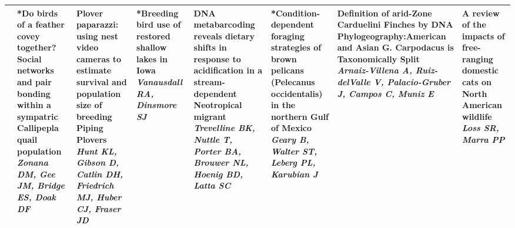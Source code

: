 \begin{tabular}{|x{0.85cm}|x{2.85cm}|x{2.85cm}|x{2.85cm}|x{2.85cm}|x{2.85cm}|x{2.85cm}|a{2.85cm}|}
&*Do birds of a feather covey together? Social networks and pair bonding within a sympatric Callipepla quail population \newline \newline \textit{Zonana DM, Gee JM, Bridge ES, Doak DF} & Plover paparazzi: using nest video cameras to estimate survival and population size of breeding Piping Plovers \newline \newline \textit{Hunt KL, Gibson D, Catlin DH, Friedrich MJ, Huber CJ, Fraser JD} & *Breeding bird use of restored shallow lakes in Iowa \newline \newline \textit{Vanausdall RA, Dinsmore SJ} & DNA metabarcoding reveals dietary shifts in response to acidification in a stream-dependent Neotropical migrant \newline \newline \textit{Trevelline BK, Nuttle T, Porter BA, Brouwer NL, Hoenig BD, Latta SC} & *Condition-dependent foraging strategies of brown pelicans (Pelecanus occidentalis) in the northern Gulf of Mexico \newline \newline \textit{Geary B, Walter ST, Leberg PL, Karubian J} & Definition of arid-Zone Carduelini Finches by DNA Phylogeography:American and Asian G. Carpodacus is Taxonomically Split \newline \newline \textit{Arnaiz-Villena A, Ruiz-delValle V, Palacio-Gruber J, Campos C, Muniz E} & A review of the impacts of free-ranging domestic cats on North American wildlife \newline \newline \textit{Loss SR, Marra PP}\\
\hline

\end{tabular}
